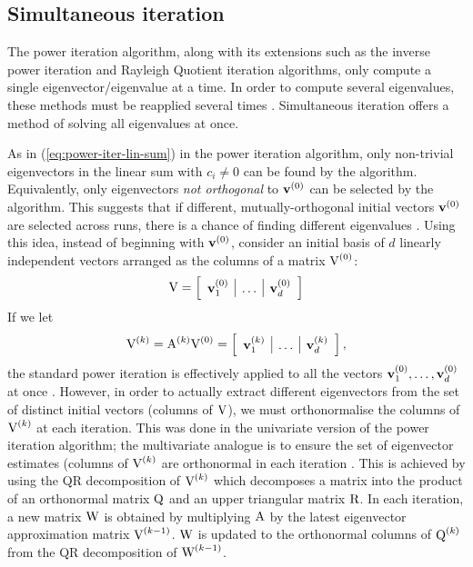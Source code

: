 \subsection{Simultaneous iteration}
\label{subsection:simultaneous-iteration}
The power iteration algorithm, along with its extensions such as the inverse power iteration and Rayleigh Quotient iteration algorithms, only compute a single eigenvector/eigenvalue at a time. In order to compute several eigenvalues, these methods must be reapplied several times \cite{panju-iterative-eig}. Simultaneous iteration offers a method of solving all eigenvalues at once. 

As in (\ref{eq:power-iter-lin-sum}) in the power iteration algorithm, only non-trivial eigenvectors in the linear sum with $c_i \neq 0$ can be found by the algorithm. Equivalently, only eigenvectors \textit{not orthogonal} to ${\mathbf{v}}^{(0)}$ can be selected by the algorithm. This suggests that if different, mutually-orthogonal initial vectors ${\mathbf{v}}^{(0)}$ are selected across runs, there is a chance of finding different eigenvalues \cite{panju-iterative-eig}. Using this idea, instead of beginning with ${\mathbf{v}}^{(0)}$, consider an initial basis of $d$ linearly independent vectors arranged as the columns of a matrix ${\textrm{V}}^{(0)}$:
\begin{equation}
    {\textrm{V}} = \left[\begin{array}{l|l|l}{\mathbf{v}}_1^{(0)} & \dots & {\mathbf{v}}_d^{(0)}\end{array}\right]
\end{equation}
If we let
\begin{equation}
       {\textrm{V}}^{(k)} = {\textrm{A}}^{(k)}{\textrm{V}}^{(0)} = \left[\begin{array}{l|l|l}{\mathbf{v}}_1^{(k)} & \dots & {\mathbf{v}}_d^{(k)}\end{array}\right],
\end{equation}
the standard power iteration is effectively applied to all the vectors ${\mathbf{v}}_1^{(0)}, \dots, {\mathbf{v}}_d^{(0)}$ at once \cite{panju-iterative-eig}. However, in order to actually extract different eigenvectors from the set of distinct initial vectors (columns of ${\textrm{V}}$), we must orthonormalise the columns of ${\textrm{V}}^{(k)}$ at each iteration. This was done in the univariate version of the power iteration algorithm; the multivariate analogue is to ensure the set of eigenvector estimates (columns of ${\textrm{V}}^{(k)}$ are orthonormal in each iteration \cite{panju-iterative-eig}. This is achieved by using the QR decomposition of ${\textrm{V}}^{(k)}$ which decomposes a matrix into the product of an orthonormal matrix ${\textrm{Q}}$ and an upper triangular matrix ${\textrm{R}}$. In each iteration, a new matrix ${\textrm{W}}$ is obtained by multiplying ${\textrm{A}}$ by the latest eigenvector approximation matrix ${\textrm{V}}^{(k-1)}$. ${\textrm{W}}$ is updated to the orthonormal columns of ${\textrm{Q}}^{(k)}$ from the QR decomposition of ${\textrm{W}}^{(k-1)}$.

